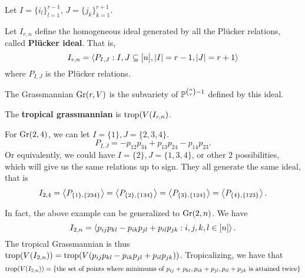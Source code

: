         Let $I = \{i_l\}_{l=1}^{r-1}$, $J = \{j_k\}_{k=1}^{r+1}$.
        \begin{definition}
        \label{def:plucker-ideal}
            Let $I_{r, n}$ define the homogeneous ideal generated by all the Pl\"{u}cker relations, called \textbf{Pl\"{u}cker ideal}.
            That is,
            \[
            I_{r, n} = \inner{P_{I, J}: I, J \subseteq [n], |I| = r - 1, |J| = r + 1}
            \] where $P_{I, J}$ is the Pl\"{u}cker relations. 
        \end{definition}
        
        \begin{proposition}
        \label{prop:grassmannian-is-zero-setof-plucker-idea}
            The Grassmannian $\gr(r, V)$ is the subvariety of $\P^{\binom{n}{r} - 1}$ defined by this ideal.
        \end{proposition}
        
        \begin{definition}
        \label{def:tropical-grassmannian}
        The \textbf{tropical grassmannian} is $\trop(V(I_{r, n})$. 
        \end{definition}
        
        \begin{example}
        \label{ex:gr-24-plucker-ideal}
            For $\gr(2, 4)$, we can let $I = \{1\}, J = \{2, 3, 4\}$.
            \[
            P_{I, J} = -p_{12}p_{34} + p_{13}p_{24} - p_{14}p_{23}.
            \]
            Or equivalently, we could have $I = \{2\}, J = \{1, 3, 4\}$,
            or other $2$ possibilities, 
            which will give us the same relations up to sign.
            They all generate the same ideal, that is 
            \[
            I_{2, 4} = \inner{P_{\{1\}, \{234\}}} = \inner{P_{\{2\}, \{134\}}} = \inner{P_{\{3\}, \{124\}}} = \inner{P_{\{4\}, \{123\}}}.
            \]
        \end{example}
        
        \begin{example}
        \label{ex:gr-2n-plucker-ideal}
        In fact, the above example can be generalized to $\gr(2, n)$.
        We have
        \[
        I_{2, n} = \inner{p_{ij}p_{kl} - p_{ik}p_{jl} + p_{il} p_{jk}: i, j, k, l \in [n]}.
        \]
        The tropical Grassmannian 
        is thus $\trop(V(I_{2, n})) = \trop(V(p_{ij}p_{kl} - p_{ik}p_{jl} + p_{il} p_{jk}))$.
        Tropicalizing, we have that 
        \[
        \trop(V(I_{2, n})) = \{\text{the set of points where minimums of } p_{ij} + p_{kl},  p_{ik} + p_{jl},  p_{il} + p_{jk} \text{ is attained twice}\}
        \]
        \end{example}
        
